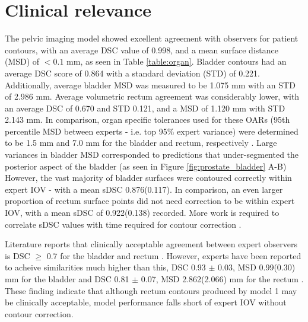 \section{Clinical relevance}
The pelvic imaging model showed excellent
agreement with observers for patient contours, with an average DSC value of 0.998, and a mean surface distance (MSD) of $<0.1$ mm, as seen in Table \ref{table:organ}. Bladder contours had an average DSC score of 0.864 with a standard deviation (STD) of 0.221. Additionally, average bladder MSD was measured to be 1.075 mm with an STD of 2.986 mm.
Average volumetric rectum agreement was considerably lower, with an average DSC of 0.670 and STD 0.121, and a MSD of 1.120 mm with STD 2.143 mm.
In comparison, organ specific tolerances used for these OARs (95th percentile MSD between experts - i.e. top 95\% expert variance) were determined to be 1.5 mm and 7.0 mm
for the bladder and rectum, respectively \cite{Roach_2019, Nikolov_2018}. Large variances in bladder MSD corresponded to predictions that under-segmented the posterior aspect of the bladder (as seen in Figure \ref{fig:prostate_bladder} A-B) However, the vast majority of bladder surfaces were contoured correctly within expert IOV - with a mean sDSC 0.876(0.117). In comparison, an even larger proportion of rectum surface points did not need correction to be within expert IOV, with a mean sDSC of 0.922(0.138) recorded. More work is required to correlate sDSC values with time required for contour correction \cite{Nikolov_2018, Vaassen_2020}.

Literature reports that clinically acceptable agreement between expert observers is DSC $\geq$ 0.7 for the bladder and rectum \cite{Roach_2019}.
However, experts have been reported to acheive similarities much higher than this,  DSC 0.93 $\pm$ 0.03, MSD 0.99(0.30) mm for the bladder and DSC 0.81 $\pm$ 0.07, MSD 2.862(2.066) mm for the rectum \cite{Roach_2019}. These finding indicate that although rectum contours produced by model 1 may be clinically acceptable, model performance falls short of expert IOV without contour correction.

